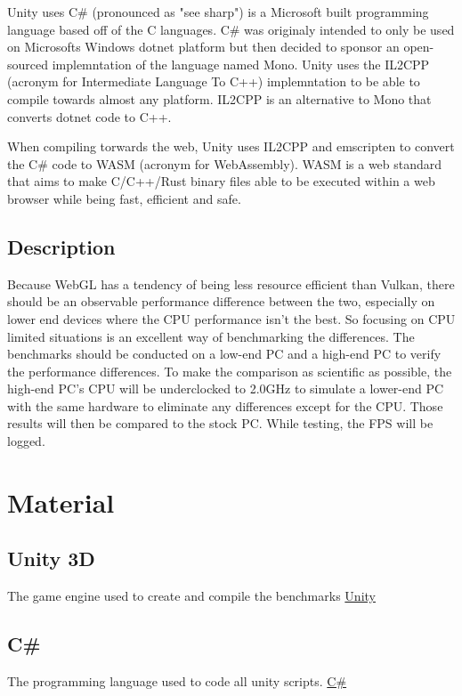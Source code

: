 \documentclass{article}
\begin{document}
Unity uses C\# (pronounced as "see sharp") is a Microsoft built programming language based off of the C languages. C\# was originaly intended to only be used on Microsofts Windows dotnet platform but then decided to sponsor an open-sourced implemntation of the language named Mono\cite{CSharpWiki}. Unity uses the IL2CPP (acronym for Intermediate Language To C++) implemntation to be able to compile towards almost any platform. IL2CPP is an alternative to Mono that converts dotnet code to C++\cite{IL2CPP}.

When compiling torwards the web, Unity uses IL2CPP and emscripten to convert the C\# code to WASM (acronym for WebAssembly)\cite{WebGL}. WASM is a web standard that aims to make C/C++/Rust binary files able to be executed within a web browser while being fast, efficient and safe\cite{WebAssembly}.

\subsection {Description}
Because WebGL has a tendency of being less resource efficient than Vulkan, there should be an observable performance difference between the two, especially on lower end devices where the CPU performance isn’t the best. So focusing on CPU limited situations is an excellent way of benchmarking the differences. The benchmarks should be conducted on a low-end PC and a high-end PC to verify the performance differences.
To make the comparison as scientific as possible, the high-end PC’s CPU will be underclocked to 2.0GHz to simulate a lower-end PC with the same hardware to eliminate any differences except for the CPU. Those results will then be compared to the stock PC. While testing, the FPS will be logged.



\section {Material}
\subsection* {Unity 3D}
The game engine used to create and compile the benchmarks
\newline\href{https://unity.com}{Unity}

\subsection* {C\#}
The programming language used to code all unity scripts.
\newline\href{https://docs.microsoft.com/en-us/dotnet/csharp/}{C\#}
\end{document}
